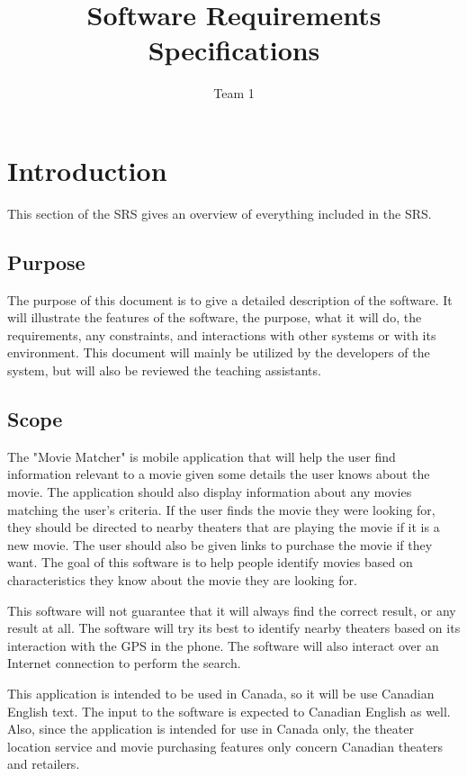 \documentclass[]{article}
\title{Software Requirements Specifications}
\author{Team 1}
\newcommand{\sname}{Movie Matcher}
\begin{document}
\maketitle	

\section{Introduction}
\label{sec:introduction}

This section of the SRS gives an overview of everything included in the SRS.

\subsection{Purpose}
\label{sub:purpose}
The purpose of this document is to give a detailed description of the software. It will illustrate the features of the software, the purpose, what it will do, the requirements, any constraints, and interactions with other systems or with its environment. This document will mainly be utilized by the developers of the system, but will also be reviewed the teaching assistants.

\subsection{Scope}
\label{sub:scope}
The "\sname" is mobile application that will help the user find information relevant to a movie given some details the user knows about the movie. The application should also display information about any movies matching the user's criteria. If the user finds the movie they were looking for, they should be directed to nearby theaters that are playing the movie if it is a new movie. The user should also be given links to purchase the movie if they want. The goal of this software is to help people identify movies based on characteristics they know about the movie they are looking for. 

This software will not guarantee that it will always find the correct result, or any result at all. The software will try its best to identify nearby theaters based on its interaction with the GPS in the phone. The software will also interact over an Internet connection to perform the search.

This application is intended to be used in Canada, so it will be use Canadian English text. The input to the software is expected to Canadian English as well. Also, since the application is intended for use in Canada only, the theater location service and movie purchasing features only concern Canadian theaters and retailers.
\end{document}
